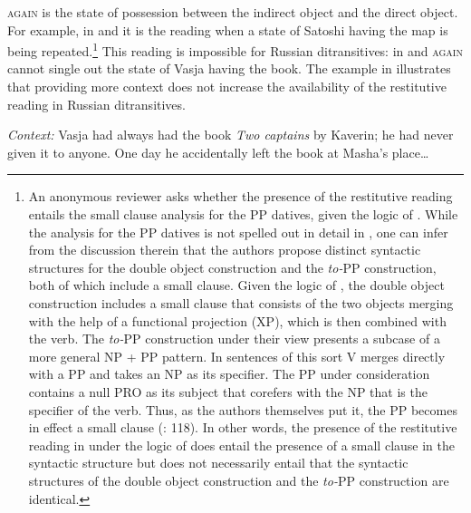 \documentclass[output=paper]{langscibook}
\begin{document}
\largerpage[-3]
 \textsc{again}{ is the state of possession between the indirect object and the direct object. For example, in  and  it is the reading when a state of Satoshi having the map is being repeated.}\footnote{An anonymous reviewer asks whether the presence of the restitutive reading entails the small clause analysis for the PP datives, given the logic of \citet{Beck-Johnson2004}. While the analysis for the PP datives is not spelled out in detail in \citet{Beck-Johnson2004}, one can infer from the discussion therein that the authors propose distinct syntactic structures for the double object construction and the \textit{to-}PP construction, both of which include a small clause. Given the logic of \citet{Beck-Johnson2004}, the double object construction includes a small clause that consists of the two objects merging with the help of a functional projection (XP), which is then combined with the verb. The \textit{to-}PP construction under their view presents a subcase of a more general NP + PP pattern. In sentences of this sort V merges directly with a PP and takes an NP as its specifier. The PP under consideration contains a null PRO as its subject that corefers with the NP that is the specifier of the verb. Thus, as the authors themselves put it, the PP becomes in effect a small clause (\citealt{Beck-Johnson2004}: 118). In other words, the presence of the restitutive reading in  under the logic of \citet{Beck-Johnson2004} does entail the presence of a small clause in the syntactic structure but does not necessarily entail that the syntactic structures of the double object construction and the \textit{to-}PP construction are identical.}{ This reading is impossible for Russian ditransitives: in  and } \textsc{again}{ cannot single out the state of Vasja having the book. The example in  illustrates that providing more context does not increase the availability of the restitutive reading in Russian ditransitives.}


 \ea\label{ex:bondarenko:7}\textit{Context:} Vasja had always had the book \textit{Two captains} by Kaverin; he had never given it to anyone. One day he accidentally left the book at Masha’s place\dots
{}
\z
\z
\end{document}

